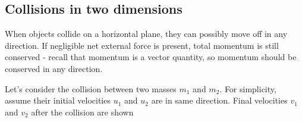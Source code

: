 \documentclass[a4paper,12pt]{book}
\begin{document}
\subsection{Collisions in two dimensions}

When objects collide on a horizontal plane, they can possibly move off in any direction. If negligible net external force is present, total momentum is still conserved - recall that momentum is a vector quantity, so momentum should be conserved in any direction.

\vspace*{\baselineskip}

Let's consider the collision between two masses $m_1$ and $m_2$. For simplicity, assume their initial velocities $u_1$ and $u_2$ are in same direction. Final velocities $v_1$ and $v_2$ after the collision are shown
\end{document}
